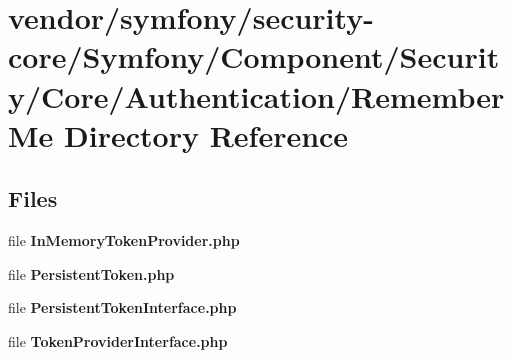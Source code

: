 \section{vendor/symfony/security-\/core/\+Symfony/\+Component/\+Security/\+Core/\+Authentication/\+Remember\+Me Directory Reference}
\label{dir_8265b430da74abfddf44f47db924a306}
\subsection*{Files}
\begin{DoxyCompactItemize}
\item 
file {\bf In\+Memory\+Token\+Provider.\+php}
\item 
file {\bf Persistent\+Token.\+php}
\item 
file {\bf Persistent\+Token\+Interface.\+php}
\item 
file {\bf Token\+Provider\+Interface.\+php}
\end{DoxyCompactItemize}
